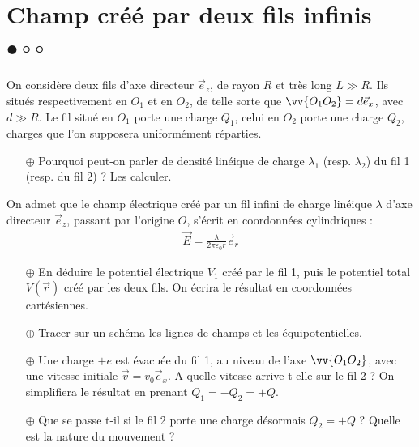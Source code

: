 \documentclass{report}
\begin{document}
\newpage

\section*{Champ créé par deux fils infinis $\bullet\circ\circ$}

On considère deux fils d'axe directeur $\vec{e}_z$, de rayon $R$ et très long $L\gg R$. Ils situés respectivement en $O_1$ et en $O_2$, de telle sorte que $\vv{O_1O_2}=d\vec{e}_x$, avec $d\gg R$. Le fil situé en $O_1$ porte une charge $Q_1$, celui en $O_2$ porte une charge $Q_2$, charges que l'on supposera uniformément réparties. 

\begin{itemize}

	\item[$\oplus$] Pourquoi peut-on parler de densité linéique de charge $\lambda_1$ (resp. $\lambda_2$) du fil 1 (resp. du fil 2) ? Les calculer.

\end{itemize}

On admet que le champ électrique créé par un fil infini de charge linéique $\lambda$ d'axe directeur $\vec{e}_z$, passant par l'origine $O$, s'écrit en coordonnées cylindriques :
\begin{align*}
	\vec{E}=\frac{\lambda}{2\pi\varepsilon_0 r}\vec{e}_r
\end{align*}

\begin{itemize}

	\item[$\oplus$] En déduire le potentiel électrique $V_1$ créé par le fil 1, puis le potentiel total $V(\vec{r})$ créé par les deux fils. On écrira le résultat en coordonnées cartésiennes.
	
	\item[$\oplus$] Tracer sur un schéma les lignes de champs et les équipotentielles. 
	
	\item[$\oplus$] Une charge $+e$ est évacuée du fil 1, au niveau de l'axe $\vv{O_1O_2}$, avec une vitesse initiale $\vec{v}=v_0\vec{e}_x$. A quelle vitesse arrive t-elle sur le fil 2 ? On simplifiera le résultat en prenant $Q_1=-Q_2=+Q$.
	
	\item[$\oplus$] Que se passe t-il si le fil 2 porte une charge désormais $Q_2=+Q$ ? Quelle est la nature du mouvement ? 

\end{itemize}
\end{document}
